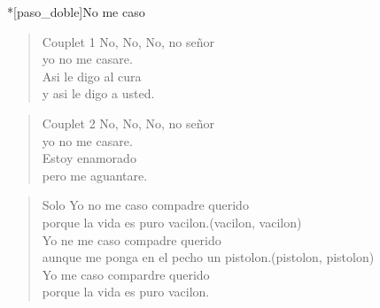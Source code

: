 \begin{song}*[paso_doble]{No me caso}
\begin{verse}{Couplet 1}
No, No, No, no se\~nor\\
yo no me casare.\\
Asi le digo al cura\\
y asi le digo a usted.\\
\end{verse}
\begin{verse}{Couplet 2}
No, No, No, no se\~nor\\
yo no me casare.\\
Estoy enamorado\\
pero me aguantare.\\
\end{verse}

\begin{verse}{Solo}
 Yo no me caso compadre querido\\
porque la vida es puro vacilon.\hspace{8em}(vacilon, vacilon)\\
\chord{\hspace{1pt}}Yo ne me caso compadre querido\\
aunque me ponga en el pecho un pistolon.\hspace{3em}(pistolon, pistolon)\\
\chord{\hspace{1pt}}Yo me caso compardre querido\\
porque la vida es puro vacilon.\\
\end{verse}

\end{song}
